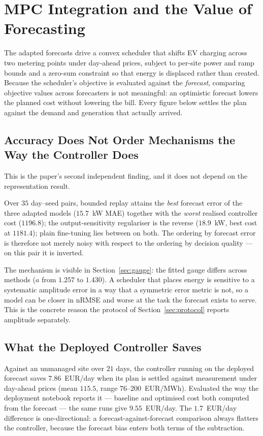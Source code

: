 \documentclass[journal]{IEEEtran}
\begin{document}
\section{MPC Integration and the Value of Forecasting}
\label{sec:mpc}


The adapted forecasts drive a convex scheduler that shifts EV charging across
two metering points under day-ahead prices, subject to per-site power and ramp
bounds and a zero-sum constraint so that energy is displaced rather than
created. Because the scheduler's objective is evaluated against the
\emph{forecast}, comparing objective values across forecasters is not
meaningful: an optimistic forecast lowers the planned cost without lowering the
bill. Every figure below settles the plan against the demand and generation
that actually arrived.

\subsection{Accuracy Does Not Order Mechanisms the Way the Controller Does}
\label{sec:inversion_decision}
This is the paper's second independent finding, and it does not depend on the
representation result.

Over $35$ day--seed pairs, bounded replay attains the \emph{best} forecast error
of the three adapted models ($15.7$~kW MAE) together with the \emph{worst}
realised controller cost ($1196.8$); the output-sensitivity regulariser is the
reverse ($18.9$~kW, best cost at $1181.4$); plain fine-tuning lies between on
both. The ordering by forecast error is therefore not merely noisy with respect
to the ordering by decision quality --- on this pair it is inverted.

The mechanism is visible in Section~\ref{sec:gauge}: the fitted gauge differs
across methods ($a$ from $1.257$ to $1.430$). A scheduler that places energy is
sensitive to a systematic amplitude error in a way that a symmetric error
metric is not, so a model can be closer in nRMSE and worse at the task the
forecast exists to serve. This is the concrete reason the protocol of
Section~\ref{sec:protocol} reports amplitude separately.

\subsection{What the Deployed Controller Saves}
Against an unmanaged site over $21$ days, the controller running on the
deployed forecast saves $7.86$~EUR/day when its plan is settled against
measurement under day-ahead prices (mean $115.5$, range $76$--$200$~EUR/MWh).
Evaluated the way the deployment notebook reports it --- baseline and optimised
cost both computed from the forecast --- the same runs give $9.55$~EUR/day. The
$1.7$~EUR/day difference is one-directional: a forecast-against-forecast
comparison always flatters the controller, because the forecast bias enters
both terms of the subtraction.
\end{document}
